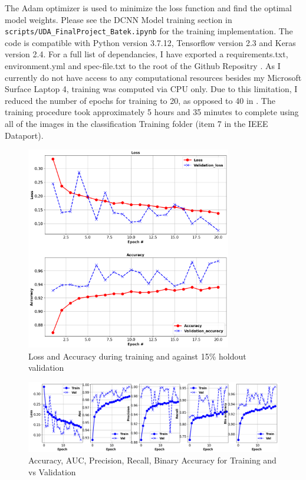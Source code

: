 \documentclass[a4paper,11pt]{article} %
\begin{document}
The Adam optimizer is used to minimize the loss function and find the optimal model weights. Please see the DCNN Model training section
in \verb!scripts/UDA_FinalProject_Batek.ipynb! for the training implementation. The code is compatible with
Python version 3.7.12, Tensorflow version 2.3 and Keras version 2.4. For a full list of dependancies, I have exported
a requirements.txt, environment.yml and spec-file.txt to the root of the Github Repositry \cite{Batek_Unstructured_Data_Analysis}.
As I currently do not have access to any computational resources besides my Microsoft Surface Laptop 4, training was computed via
CPU only. Due to this limitation, I reduced the number of epochs for training to 20, as opposed to 40 in \cite{FLAME_dataset}. The training
procedure took approximately 5 hours and 35 minutes to complete using all of the images in the classification Training folder (item 7 in the IEEE Dataport). 

\begin{figure}[h]
    \centering
    \includegraphics[width=0.8\textwidth]{../figures/training_loss_accuracy.png}
    \caption{Loss and Accuracy during training and against 15\% holdout validation}
    \label{fig:train_loss_accuracy}
\end{figure}

\begin{figure}[h]
    \centering
    \includegraphics[width=\textwidth]{../figures/training_metrics.png}
    \caption{Accuracy, AUC, Precision, Recall, Binary Accuracy for Training and vs Validation}
\end{figure}
\end{document}
